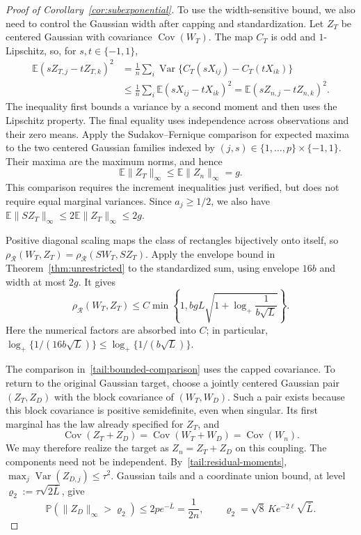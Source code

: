 \documentclass[11pt,letterpaper]{article}
\theoremstyle{remark}
\newcommand{\E}{\mathbb E}
\newcommand{\Pp}{\mathbb P}
\newcommand{\Cov}{\operatorname{Cov}}
\newcommand{\Var}{\operatorname{Var}}
\newcommand{\rh}{\rho_{\mathcal R}}
\begin{document}
\begin{proof}[Proof of Corollary~\ref{cor:subexponential}]
To use the width-sensitive bound, we also need to control the Gaussian
width after capping and standardization. Let $Z_T$ be centered Gaussian
with covariance $\Cov(W_T)$. The map $C_T$ is odd and $1$-Lipschitz,
so, for $s,t\in\{-1,1\}$,
\begin{align*}
 \E(sZ_{T,j}-tZ_{T,k})^2
 &=\frac1n\sum_i\Var\{C_T(sX_{ij})-C_T(tX_{ik})\}\\
 &\le\frac1n\sum_i\E(sX_{ij}-tX_{ik})^2
 =\E(sZ_{n,j}-tZ_{n,k})^2.
\end{align*}
The inequality first bounds a variance by a second moment and then
uses the Lipschitz property. The final equality uses independence
across observations and their zero means.
Apply the Sudakov--Fernique comparison for expected maxima
\cite[Theorem~2.6.5]{AdlerTaylorWorsley2015} to the two centered
Gaussian families indexed by $(j,s)\in\{1,\ldots,p\}\times\{-1,1\}$.
Their maxima are the maximum norms, and hence
\begin{equation}
 \E\|Z_T\|_\infty\le\E\|Z_n\|_\infty=g.
 \label{tail:width-contraction}
\end{equation}
This comparison requires the increment inequalities just verified,
but does not require equal marginal variances.
Since $a_j\ge1/2$, we also have
$\E\|SZ_T\|_\infty\le2\E\|Z_T\|_\infty\le2g$.

Positive diagonal scaling maps the class of rectangles bijectively
onto itself, so $\rh(W_T,Z_T)=\rh(SW_T,SZ_T)$.
Apply the envelope bound in Theorem~\ref{thm:unrestricted} to the
standardized sum, using envelope $16b$ and width at most $2g$.
It gives
\begin{equation}
 \rh(W_T,Z_T)\le C\min\left\{1,
 bgL\sqrt{1+\log_+\frac1{b\sqrt L}}\right\}.
 \label{tail:bounded-comparison}
\end{equation}
Here the numerical factors are absorbed into $C$; in particular,
$\log_+\{1/(16b\sqrt L)\}\le\log_+\{1/(b\sqrt L)\}$.

The comparison in~\eqref{tail:bounded-comparison} uses the capped
covariance. To return to the original Gaussian target, choose a jointly
centered Gaussian pair $(Z_T,Z_D)$ with the block covariance of
$(W_T,W_D)$. Such a pair exists because this block covariance is
positive semidefinite, even when singular. Its first marginal has the
law already specified for $Z_T$, and
\[
 \Cov(Z_T+Z_D)=\Cov(W_T+W_D)=\Cov(W_n).
\]
We may therefore realize the target as $Z_n=Z_T+Z_D$ on this coupling.
The components need not be independent. By~\eqref{tail:residual-moments},
$\max_j\Var(Z_{D,j})\le\tau^2$.
Gaussian tails and a coordinate union bound, at level
$\varrho_2:=\tau\sqrt{2\bar L}$, give
\begin{equation}
 \Pp(\|Z_D\|_\infty>\varrho_2)
 \le2p e^{-\bar L}=\frac1{2n},\qquad
 \varrho_2=\sqrt8\,Ke^{-2\ell}\sqrt{\bar L}.
 \label{tail:Gaussian-coupling}
\end{equation}


\end{proof}
\end{document}
